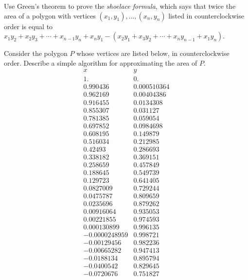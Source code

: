 \documentclass[prettycode,shellescape]{watsonbook}
\begin{document}
\begin{aexercise}
  Use Green's theorem to prove the \textit{shoelace
    formula}, which says that twice the area of a polygon with vertices
  $(x_1,y_1),\ldots,(x_n,y_n)$ listed in counterclockwise order is equal
  to 
  $x_1y_2 + x_2 y_3 + \cdots + x_{n-1}y_n + x_n y_1 - (x_2 y_1 + x_3 y_2
  + \cdots + x_{n}y_{n-1}+ x_1 y_n)$.
\end{aexercise}

\begin{aexercise}
  Consider the polygon $P$ whose vertices are listed below, in
  counterclockwise order. Describe a simple algorithm for
  approximating the area of $P$.  {\tiny
    $$
    \begin{array}{cc}
      x & y \\ \hline 
      1. & 0. \\
      0.990436 & 0.000510364 \\
      0.962169 & 0.00404386 \\
      0.916455 & 0.0134308 \\
      0.855307 & 0.031127 \\
      0.781385 & 0.059054 \\
      0.697852 & 0.0984698 \\
      0.608195 & 0.149879 \\
      0.516034 & 0.212985 \\
      0.42493 & 0.286693 \\
      0.338182 & 0.369151 \\
      0.258659 & 0.457849 \\
      0.188645 & 0.549739 \\
      0.129723 & 0.641405 \\
      0.0827009 & 0.729244 \\
      0.0475787 & 0.809659 \\
      0.0235696 & 0.879262 \\
      0.00916064 & 0.935053 \\
      0.00221855 & 0.974593 \\
      0.000130899 & 0.996135 \\
      -0.0000248959 & 0.998721 \\
      -0.00129456 & 0.982236 \\
      -0.00665282 & 0.947413 \\
      -0.0188134 & 0.895794 \\
      -0.0400542 & 0.829645 \\
      -0.0720676 & 0.751827 \\

\end{array}$$}
\end{aexercise}
\end{document}
